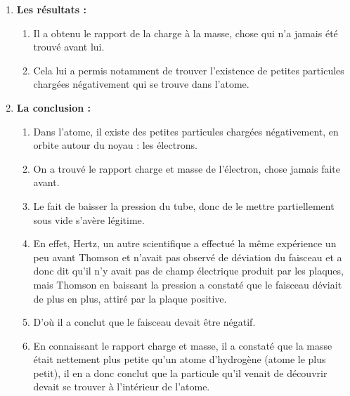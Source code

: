 \documentclass[../main.tex]{subfiles}
\begin{document}
\begin{enumerate}[I]
\begin{enumerate}
    \end{enumerate}
    \item \textbf {Les résultats :}
    \begin{enumerate}
        \item Il a obtenu le rapport de la charge à la masse, chose qui n'a jamais été trouvé avant lui.
        \item Cela lui a permis notamment de trouver l'existence de petites particules chargées négativement qui se trouve dans l'atome. 
    \end{enumerate}
    \item \textbf {La conclusion :}
    \begin{enumerate}
        \item Dans l'atome, il existe des petites particules chargées négativement, en orbite autour du noyau : les électrons.
        \item On a trouvé le rapport charge et masse de l'électron, chose jamais faite avant.
        \item Le fait de baisser la pression du tube, donc de le mettre partiellement sous vide s'avère légitime.
        \item En effet, Hertz, un autre scientifique a effectué la même expérience un peu avant Thomson et n'avait pas observé de déviation du faisceau et a donc dit qu'il n'y avait pas de champ électrique produit par les plaques, mais Thomson en baissant la pression a constaté que le faisceau déviait de plus en plus, attiré par la plaque positive.
        \item D'où il a conclut que le faisceau devait être négatif.
        \item En connaissant le rapport charge et masse, il a constaté que la masse était nettement plus petite qu'un atome d'hydrogène (atome le plus petit), il en a donc conclut que la particule qu'il venait de découvrir devait se trouver à l'intérieur de l'atome.
    
    \end{enumerate}
\end{enumerate}



\end{document}
